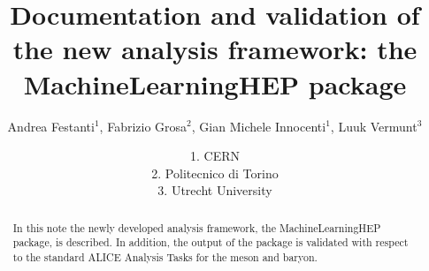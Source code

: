 \documentclass[ALICE,manyauthors]{ALICE_analysis_notes}
\begin{document}
%

\linenumbers

%
%
\begin{titlepage}
%
\PHdate{\today}
%
\title{Documentation and validation of the new analysis framework: the MachineLearningHEP package}
%
\author{Andrea Festanti$^{1}$, Fabrizio Grosa$^{2}$, Gian Michele Innocenti$^{1}$, Luuk Vermunt$^{3}$}
\author{
1. CERN\\
2. Politecnico di Torino\\
3. Utrecht University\\
}
%
%
\begin{abstract}
In this note the newly developed analysis framework, the MachineLearningHEP package, is described. In addition, the output of the package is validated with respect to the standard ALICE Analysis Tasks for the \Ds meson and \Lc baryon.
\end{abstract}
\end{titlepage}
\setcounter{page}{2}
%
\clearpage
{}
\tableofcontents
\clearpage
\clearpage
 
\clearpage

\clearpage


\end{document}
